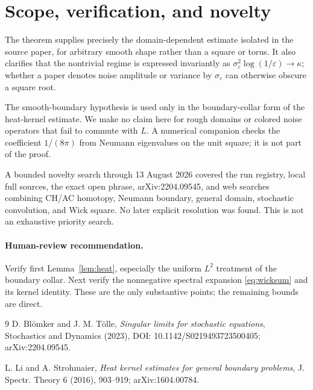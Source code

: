 \documentclass[11pt]{article}
\begin{document}
\section{Scope, verification, and novelty}

The theorem supplies precisely the domain-dependent estimate isolated in the
source paper, for arbitrary smooth shape rather than a square or torus.  It
also clarifies that the nontrivial regime is expressed invariantly as
$\sigma_\varepsilon^2\log(1/\varepsilon)\to\kappa$; whether a paper denotes
noise amplitude or variance by $\sigma_\varepsilon$ can otherwise obscure a
square root.

The smooth-boundary hypothesis is used only in the boundary-collar form of
the heat-kernel estimate.  We make no claim here for rough domains or colored
noise operators that fail to commute with $L$.  A numerical companion checks
the coefficient $1/(8\pi)$ from Neumann eigenvalues on the unit square; it is
not part of the proof.

A bounded novelty search through 13 August 2026 covered the run registry,
local full sources, the exact open phrase, arXiv:2204.09545, and web searches
combining CH/AC homotopy, Neumann boundary, general domain, stochastic
convolution, and Wick square.  No later explicit resolution was found.  This
is not an exhaustive priority search.

\paragraph{Human-review recommendation.}
Verify first Lemma~\ref{lem:heat}, especially the uniform $L^2$ treatment of
the boundary collar.  Next verify the nonnegative spectral expansion
\eqref{eq:wicksum} and its kernel identity.  These are the only substantive
points; the remaining bounds are direct.

\begin{thebibliography}{9}
D. Bl\"omker and J. M. T\"olle,
\emph{Singular limits for stochastic equations},
Stochastics and Dynamics (2023), DOI: 10.1142/S0219493723500405;
arXiv:2204.09545.

L. Li and A. Strohmaier,
\emph{Heat kernel estimates for general boundary problems},
J. Spectr. Theory 6 (2016), 903--919;
arXiv:1604.00784.
\end{thebibliography}
\end{document}
